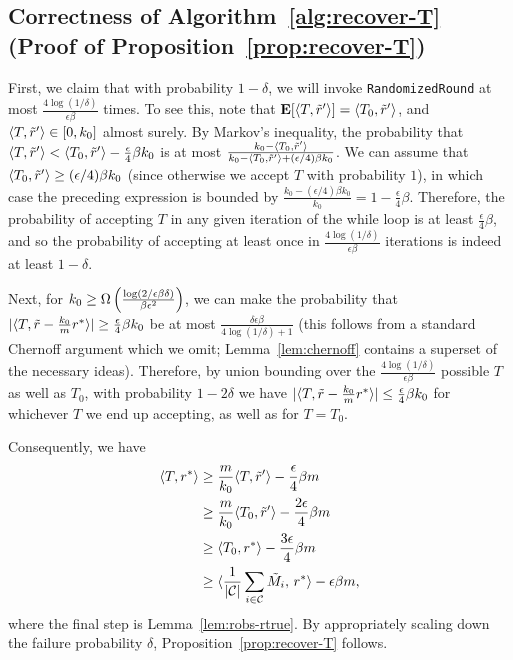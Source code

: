 \subsection{Correctness of Algorithm~\ref{alg:recover-T} (Proof of Proposition~\ref{prop:recover-T})}
\label{sec:recover-T-proof}

First, we claim that with probability $1-\delta$, we will invoke 
\texttt{RandomizedRound} at most $\frac{4\log(1/\delta)}{\epsilon\beta}$ times. 
To see this, note that $\mathbf{E}[\langle T, \tilde{r}' \rangle] = \langle T_0, \tilde{r}' \rangle$, and 
$\langle T, \tilde{r}' \rangle \in [0, k_0]$ almost surely. 
By Markov's inequality, the probability that 
$\langle T, \tilde{r}' \rangle < \langle T_0, \tilde{r}' \rangle - \frac{\epsilon}{4}\beta k_0$ is at most $\frac{k_0 - \langle T_0, \tilde{r}' \rangle}{k_0 - \langle T_0, \tilde{r}' \rangle + (\epsilon/4)\beta k_0}$. We can assume that 
$\langle T_0, \tilde{r}' \rangle \geq (\epsilon/4)\beta k_0$ (since otherwise 
we accept $T$ with probability $1$), in which case the preceding expression 
is bounded by 
$\frac{k_0 - (\epsilon/4)\beta k_0}{k_0} = 1 - \frac{\epsilon}{4}\beta$. 
Therefore, the probability of accepting $T$ in any given iteration of the while 
loop is at least $\frac{\epsilon}{4}\beta$, and so the probability of 
accepting at least once in $\frac{4\log(1/\delta)}{\epsilon\beta}$ iterations is 
indeed at least $1 - \delta$.

Next, for $k_0 \geq \Omega\left( \frac{\log(2/\epsilon\beta\delta)}{\beta \epsilon^2} \right)$, 
we can make the probability that $|\langle T, \tilde{r} - \frac{k_0}{m}r^* \rangle| \geq \frac{\epsilon}{4} \beta k_0$ be at most $\frac{\delta\epsilon\beta}{4\log(1/\delta)+1}$ (this follows from a standard Chernoff argument which we omit; 
Lemma~\ref{lem:chernoff} contains a superset of the necessary ideas). 
Therefore, by union bounding over the $\frac{4\log(1/\delta)}{\epsilon\beta}$ 
possible $T$ as well as $T_0$, with probability $1-2\delta$ we have $|\langle T, \tilde{r} - \frac{k_0}{m} r^* \rangle| \leq \frac{\epsilon}{4}\beta k_0$ for whichever $T$ we end up accepting, as well as for $T = T_0$.

Consequently, we have
\begin{align}
\langle T, r^* \rangle &\geq \frac{m}{k_0} \langle T, \tilde{r}' \rangle - \frac{\epsilon}{4}\beta m \\
 &\geq \frac{m}{k_0} \langle T_0, \tilde{r}' \rangle - \frac{2\epsilon}{4}\beta m \\
 &\geq \langle T_0, r^* \rangle - \frac{3\epsilon}{4}\beta m \\
 &\geq \langle \frac{1}{|\mathcal{C}|} \sum_{i \in \mathcal{C}} \tilde{M}_i,\, r^* \rangle - \epsilon\beta m,
\end{align}
where the final step is Lemma~\ref{lem:robs-rtrue}.
By appropriately scaling 
down the failure probability $\delta$, Proposition~\ref{prop:recover-T} follows.
